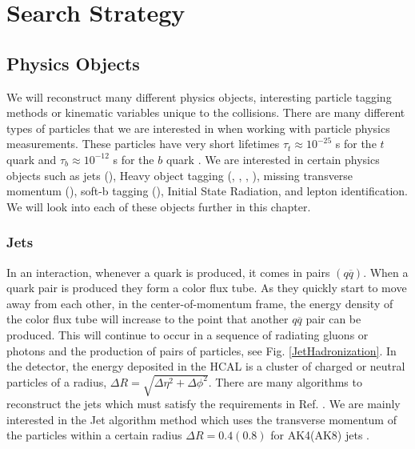 \chapter{Search Strategy}
\label{ch:SearchStrategy}

\section{Physics Objects}\label{PhysObj}
We will reconstruct many different physics objects, interesting particle tagging methods or kinematic variables unique to the collisions. There are many different types of particles that we are interested in when working with particle physics measurements. These particles have very short lifetimes $\tau_t\approx10^{-25}$ s for the $t$ quark \cite{quadt_top_2007} and $\tau_b\approx10^{-12}$ s for the $b$ quark \cite{lenz_lifetimes_2019}. We are interested in certain physics objects such as jets (\nj), Heavy object tagging (\nb, \nt, \nrt, \nw), missing transverse momentum (\met), soft-b tagging (\nsv), Initial State Radiation, and lepton identification. We will look into each of these objects further in this chapter.


\subsection{Jets}\label{Jets}
In an interaction, whenever a quark is produced, it comes in pairs $(q\overline{q})$. When a quark pair is produced they form a color flux tube. As they quickly start to move away from each other, in the center-of-momentum frame, the energy density of the color flux tube will increase to the point that another $q\overline{q}$ pair can be produced. This will continue to occur in a sequence of radiating gluons or photons and the production of pairs of particles, see Fig. \ref{JetHadronization}. 
In the detector, the energy deposited in the HCAL is a cluster of charged or neutral particles of a radius, $\Delta R=\sqrt{\Delta\eta^2+\Delta\phi^2}$. There are many algorithms to reconstruct the jets which must satisfy the requirements in Ref. \cite{noauthor_jet_2010}. We are mainly interested in the \antikt{} Jet algorithm \cite{cacciari_anti-ktjet_2008} method which uses the transverse momentum of the particles within a certain radius $\Delta R = 0.4 (0.8)$ for AK4(AK8) jets \cite{noauthor_https://twiki.cern.ch/twiki/bin/view/cms/jetid_nodate, noauthor_https://twiki.cern.ch/twiki/bin/view/cms/introtojec_nodate}. 


